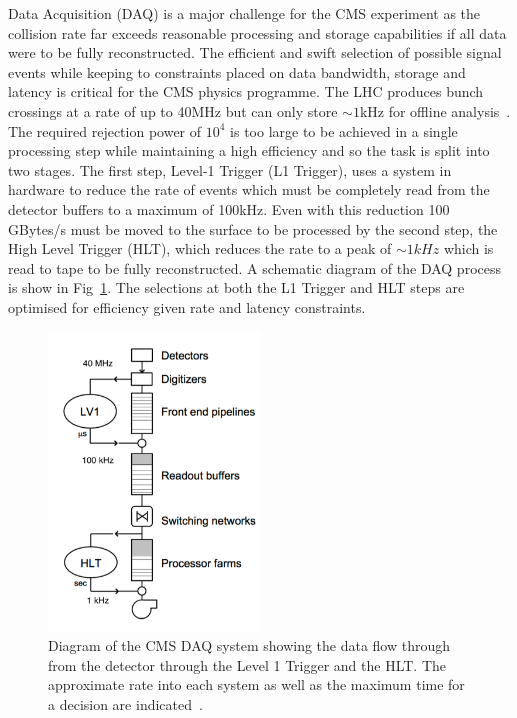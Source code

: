 Data Acquisition (DAQ) is a major challenge for the CMS experiment as the collision rate far exceeds reasonable processing 
and storage capabilities if all data were to be fully reconstructed. The efficient and swift selection of
possible signal events while keeping to constraints placed on data bandwidth, storage and latency is critical
for the CMS physics programme. The LHC produces bunch crossings at a rate of up to 40MHz but can only
store $\sim1$kHz for offline analysis~\cite{daq_tdr}. The required rejection power of $10^4$ is too large to be achieved
in a single processing step while maintaining a high efficiency and so the task is split into two stages.
The first step, Level-1 Trigger (L1 Trigger), uses a system in hardware to reduce the rate of events which must be completely 
read from the detector buffers to a maximum of 100kHz. Even with this reduction 100 GBytes/s must be moved to the surface
to be processed by the second step, the High Level Trigger (HLT), which reduces the rate to a peak of $\sim 1kHz$ which is 
read to tape to be fully reconstructed. A schematic diagram of the DAQ process is show in Fig~\ref{fig:DAQ_SLICE}. 
The selections at both the L1 Trigger and HLT steps are optimised for efficiency given rate and latency constraints.

\begin{figure}
\centering
    \includegraphics[width=0.5\textwidth]{./Figures/detector/daq_sys}
  \caption{Diagram of the CMS DAQ system showing the data flow through from the detector through the Level 1 Trigger
and the HLT. The approximate rate into each system as well as the maximum time for a decision are indicated~\cite{daq_tdr}.}
  \label{fig:DAQ_SLICE}
\end{figure}

